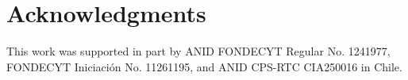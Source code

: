 \section*{Acknowledgments} 
This work was supported in part by ANID FONDECYT Regular No. 1241977, FONDECYT Iniciación No. 11261195, and ANID CPS-RTC CIA250016 in Chile. 